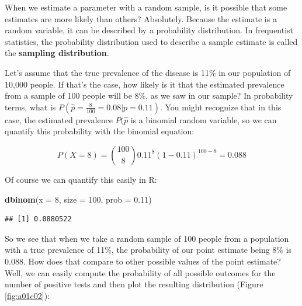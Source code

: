 \documentclass[
]{book}
\newenvironment{Shaded}{\begin{snugshade}}{\end{snugshade}}
\newcommand{\AttributeTok}[1]{\textcolor[rgb]{0.13,0.29,0.53}{#1}}
\newcommand{\DecValTok}[1]{\textcolor[rgb]{0.00,0.00,0.81}{#1}}
\newcommand{\FloatTok}[1]{\textcolor[rgb]{0.00,0.00,0.81}{#1}}
\newcommand{\FunctionTok}[1]{\textcolor[rgb]{0.13,0.29,0.53}{\textbf{#1}}}
\newcommand{\NormalTok}[1]{#1}
\begin{document}
When we estimate a parameter with a random sample, is it possible that some estimates are more likely than others? Absolutely. Because the estimate is a random variable, it can be described by a probability distribution. In frequentist statistics, the probability distribution used to describe a sample estimate is called the \textbf{sampling distribution}.

Let's assume that the true prevalence of the disease is 11\% in our population of 10,000 people. If that's the case, how likely is it that the estimated prevalence from a sample of 100 people will be 8\%, as we saw in our sample? In probability terms, what is \(P(\hat{p}=\frac{8}{100}=0.08|p=0.11)\). You might recognize that in this case, the estimated prevalence \(P(\hat{p}\) is a binomial random variable, so we can quantify this probability with the binomial equation:

\[
P(X = 8) = \binom{100}{8} 0.11^8 (1 - 0.11)^{100 - 8}=0.088
\]

Of course we can quantify this easily in R:

\begin{Shaded}
\begin{Highlighting}[]
\FunctionTok{dbinom}\NormalTok{(}\AttributeTok{x =} \DecValTok{8}\NormalTok{, }\AttributeTok{size =} \DecValTok{100}\NormalTok{, }\AttributeTok{prob =} \FloatTok{0.11}\NormalTok{)}
\end{Highlighting}
\end{Shaded}

\begin{verbatim}
## [1] 0.0880522
\end{verbatim}

So we see that when we take a random sample of 100 people from a population with a true prevalence of 11\%, the probability of our point estimate being 8\% is 0.088. How does that compare to other possible values of the point estimate? Well, we can easily compute the probability of all possible outcomes for the number of positive tests and then plot the resulting distribution (Figure \ref{fig:a01c02}):
\end{document}
